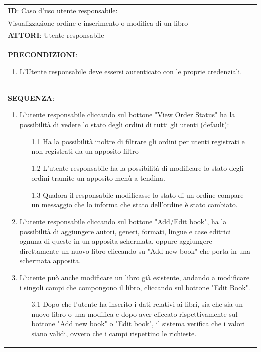 \documentclass[a4paper,11pt]{report}
\begin{document}
  \clearpage
  
  
   \begin{table}[h!]
    \renewcommand*{\arraystretch}{1.2}
    \centering
    \begin{tabularx}{\textwidth}{|X|} \hline
      \textbf{ID}: Caso d'uso utente responsabile: \\Visualizzazione ordine e inserimento o modifica di un libro\\
      \hline
      \textbf{ATTORI}: Utente responsabile \\
      \hline
      \textbf{PRECONDIZIONI}:
      \begin{enumerate}
        \item L'Utente responsabile deve essersi autenticato con le proprie credenziali.
      \end{enumerate} \\
      \hline
      \textbf{SEQUENZA}:
      \begin{enumerate}
        \item L'utente responsabile cliccando sul bottone "View Order Status" ha la possibilità di vedere lo stato degli ordini di tutti gli utenti (default):
        \begin{enumerate}
            \item [1.1] Ha la possibilità inoltre di filtrare gli ordini per utenti registrati e non registrati da un apposito filtro
            \item [1.2] L'utente responsabile ha la possibilità di modificare lo stato degli ordini tramite un apposito menù a tendina.
            \item [1.3] Qualora il responsabile modificasse lo stato di un ordine compare un messaggio che lo informa che stato dell'ordine è stato cambiato.
        \end{enumerate}
        \item L'utente responsabile cliccando sul bottone "Add/Edit book", ha la possibilità di aggiungere autori, generi, formati, lingue e case editrici ognuna di queste in un apposita schermata, oppure aggiungere direttamente un nuovo libro cliccando su "Add new book" che porta in una schermata apposita. 
        \item L'utente può anche modificare un libro già esistente, andando a modificare i singoli campi che compongono il libro, cliccando sul bottone "Edit Book".
        \begin{enumerate}
            \item [3.1] Dopo che l'utente ha inserito i dati relativi ai libri, sia che sia un nuovo libro o una modifica e dopo aver cliccato rispettivamente sul bottone "Add new book" o "Edit book", il sistema verifica che i valori siano validi, ovvero che i campi rispettino le richieste. 

\end{enumerate}
\end{enumerate}
\end{tabularx}
\end{table}
\end{document}
